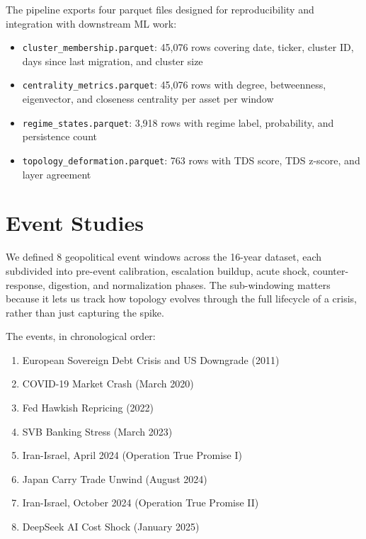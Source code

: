 \documentclass[12pt, letterpaper]{article}
\begin{document}
The pipeline exports four parquet files designed for reproducibility and integration with downstream ML work:

\begin{itemize}
    \item \texttt{cluster\_membership.parquet}: 45,076 rows covering date, ticker, cluster ID, days since last migration, and cluster size
    \item \texttt{centrality\_metrics.parquet}: 45,076 rows with degree, betweenness, eigenvector, and closeness centrality per asset per window
    \item \texttt{regime\_states.parquet}: 3,918 rows with regime label, probability, and persistence count
    \item \texttt{topology\_deformation.parquet}: 763 rows with TDS score, TDS z-score, and layer agreement
\end{itemize}

\section{Event Studies}

We defined 8 geopolitical event windows across the 16-year dataset, each subdivided into pre-event calibration, escalation buildup, acute shock, counter-response, digestion, and normalization phases. The sub-windowing matters because it lets us track how topology evolves through the full lifecycle of a crisis, rather than just capturing the spike.

The events, in chronological order:

\begin{enumerate}
    \item European Sovereign Debt Crisis and US Downgrade (2011)
    \item COVID-19 Market Crash (March 2020)
    \item Fed Hawkish Repricing (2022)
    \item SVB Banking Stress (March 2023)
    \item Iran-Israel, April 2024 (Operation True Promise I)
    \item Japan Carry Trade Unwind (August 2024)
    \item Iran-Israel, October 2024 (Operation True Promise II)
    \item DeepSeek AI Cost Shock (January 2025)
\end{enumerate}
\end{document}
